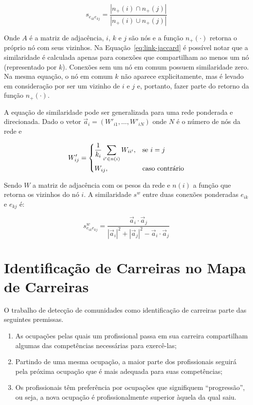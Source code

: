 \documentclass[
  article,
  11pt,
  a4paper,
  english,
  brazil,
  sumario=tradicional]{abntex2}
\begin{document}
\begin{equation} \label{eq:link-jaccard}
s_{e_{ik} e_{kj}} = \frac{|n_+(i) \cap n_+(j)|}{|n_+(i) \cup n_+(j)|}
\end{equation}

Onde $A$ é a matriz de adjacência, $i$, $k$ e $j$ são nós e a função $n_+(\cdot)$ retorna o próprio nó com seus vizinhos. Na Equação~\ref{eq:link-jaccard} é possível notar que a similaridade é calculada apenas para conexões que compartilham ao menos um nó (representado por $k$). Conexões sem um nó em comum possuem similaridade zero. Na mesma equação, o nó em comum $k$ não aparece explicitamente, mas é levado em consideração por ser um vizinho de $i$ e $j$ e, portanto, fazer parte do retorno da função $n_+(\cdot)$.

A equação de similaridade pode ser generalizada para uma rede ponderada e direcionada. Dado o vetor $\vec{a}_i = (W'_{i1}, \ldots, W'_{iN})$ onde $N$ é o número de nós da rede e

\begin{equation}
W'_{ij} = \begin{dcases}
            \frac{1}{k_i} \sum_{i' \in n(i)} W_{ii'}, & \text{se $i = j$} \\
            W_{ij}, & \text{caso contrário}
          \end{dcases}
\end{equation}

Sendo $W$ a matriz de adjacência com os pesos da rede e $n(i)$ a função que retorna os vizinhos do nó $i$. A similaridade $s^w$ entre duas conexões ponderadas $e_{ik}$ e $e_{kj}$ é:

\begin{equation}
s^w_{e_{ik} e_{kj}} = \frac{\vec{a}_i \cdot \vec{a}_j}
           {|\vec{a}_i|^2 + |\vec{a}_j|^2 - \vec{a}_i \cdot \vec{a}_j}
\end{equation}

\section{Identificação de Carreiras no Mapa de Carreiras}

O trabalho de detecção de comunidades como identificação de carreiras parte das seguintes premissas.

\begin{enumerate}
  \item As ocupações pelas quais um profissional passa em sua carreira compartilham algumas das competências necessárias para exercê-las;
  \item Partindo de uma mesma ocupação, a maior parte dos profissionais seguirá pela próxima ocupação que é mais adequada para suas competências;
  \item Os profissionais têm preferência por ocupações que signifiquem \enquote{progressão}, ou seja, a nova ocupação é profissionalmente superior àquela da qual saiu.
\end{enumerate}
\end{document}
